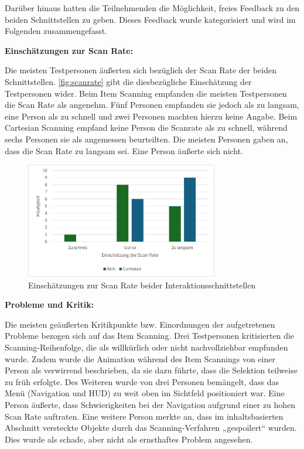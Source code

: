 Darüber hinaus hatten die Teilnehmenden die Möglichkeit, freies Feedback zu den beiden Schnittstellen zu geben. Dieses Feedback wurde kategorisiert und wird im Folgenden zusammengefasst. 

\textbf{Einschätzungen zur Scan Rate:}

Die meisten Testpersonen äußerten sich bezüglich der Scan Rate der beiden Schnittstellen. \autoref{fig:scanrate} gibt die diesbezügliche Einschätzung der Testpersonen wider. Beim Item Scanning empfanden die meisten Testpersonen die Scan Rate als angenehm. Fünf Personen empfanden sie jedoch als zu langsam, eine Person als zu schnell und zwei Personen machten hierzu keine Angabe. Beim Cartesian Scanning empfand keine Person die Scanrate als zu schnell, während sechs Personen sie als angemessen beurteilten. Die meisten Personen gaben an, dass die Scan Rate zu langsam sei. Eine Person äußerte sich nicht.

\begin{figure}[tbh]
    \centering
    \includegraphics[width=0.75\textwidth]{images/Results/ScanRate.png}
    \caption{Einschätzungen zur Scan Rate beider Interaktionsschnittstellen}
    \label{fig:scanrate}
\end{figure}

\textbf{Probleme und Kritik:}

Die meisten geäußerten Kritikpunkte bzw. Einordnungen der aufgetretenen Probleme bezogen sich auf das Item Scanning. Drei Testpersonen kritisierten die Scanning-Reihenfolge, die als willkürlich oder nicht nachvollziehbar empfunden wurde. Zudem wurde die Animation während des Item Scannings von einer Person als verwirrend beschrieben, da sie dazu führte, dass die Selektion teilweise zu früh erfolgte. Des Weiteren wurde von drei Personen bemängelt, dass das Menü (Navigation und HUD) zu weit oben im Sichtfeld positioniert war. Eine Person äußerte, dass Schwierigkeiten bei der Navigation aufgrund einer zu hohen Scan Rate auftraten. Eine weitere Person merkte an, dass im inhaltsbasierten Abschnitt versteckte Objekte durch das Scanning-Verfahren „gespoilert“ wurden. Dies wurde als schade, aber nicht als ernsthaftes Problem angesehen. 

